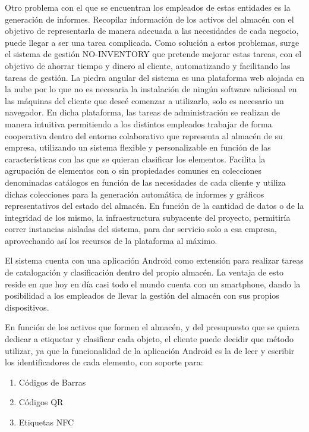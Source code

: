 Otro problema con el que se encuentran los empleados de estas entidades es la generación de informes. Recopilar información de los activos del almacén con el objetivo de representarla de manera adecuada a las necesidades de cada negocio, puede llegar a ser una tarea complicada. 
Como solución a estos problemas, surge el sistema de gestión NO-INVENTORY que pretende mejorar estas tareas, con el objetivo de ahorrar tiempo y dinero al cliente, automatizando y facilitando las tareas de gestión. 
La piedra angular del sistema es una plataforma web alojada en la nube por lo que no es necesaria la instalación de ningún software adicional en las máquinas del cliente que deseé comenzar a utilizarlo, solo es necesario un navegador.  En dicha plataforma, las tareas de administración se realizan de manera intuitiva permitiendo a los distintos empleados trabajar de forma cooperativa dentro del entorno colaborativo que representa al almacén de su empresa, utilizando un sistema flexible y personalizable en función de las características con las que se quieran clasificar los elementos. Facilita la agrupación de elementos con o sin propiedades comunes en colecciones denominadas catálogos en función de las necesidades de cada cliente y utiliza dichas colecciones para la generación automática de informes y gráficos representativos del estado del almacén. En función de la cantidad de datos o de la integridad de los mismo, la infraestructura subyacente del proyecto, permitiría correr instancias aisladas del sistema, para dar servicio solo a esa empresa, aprovechando así los recursos de la plataforma al máximo. 

El sistema cuenta con una aplicación Android como extensión para realizar tareas de catalogación y clasificación dentro del propio almacén. La ventaja de esto reside en que hoy en día casi todo el mundo cuenta con un smartphone, dando la posibilidad a los empleados de llevar la gestión del almacén con sus propios dispositivos.

En función de los activos que formen el almacén, y del presupuesto que se quiera dedicar a etiquetar y clasificar cada objeto, el cliente puede decidir que método utilizar, ya que la funcionalidad de la aplicación Android es la de leer y escribir los identificadores de cada elemento, con soporte para:
\begin{enumerate}
\item Códigos de Barras
\item Códigos QR
\item Etiquetas NFC 
\end{enumerate}

